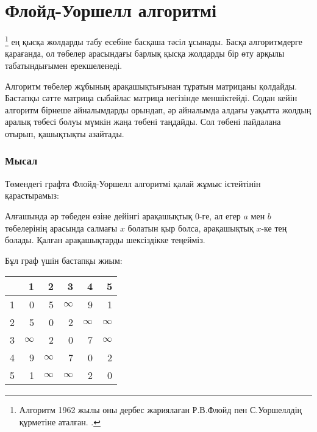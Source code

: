 \section{Флойд-Уоршелл алгоритмі}


\footnote{Алгоритм 1962 жылы оны дербес жариялаған Р.В.Флойд пен С.Уоршеллдің құрметіне аталған. \cite{flo62,war62}.}
ең қысқа жолдарды табу есебіне басқаша тәсіл ұсынады.
Басқа алгоритмдерге қарағанда, ол төбелер арасындағы барлық қысқа жолдарды бір өту арқылы табатындығымен ерекшеленеді.

Алгоритм төбелер жұбының арақашықтығынан тұратын матрицаны қолдайды. Бастапқы сәтте матрица сыбайлас матрица негізінде меншіктейді.   
Содан кейін алгоритм бірнеше айналымдарды орындап, әр айналымда алдағы уақытта жолдың аралық төбесі болуы мүмкін жаңа төбені таңдайды.  Сол төбені пайдалана отырып, қашықтықты азайтады.

\subsubsection{Мысал}

Төмендегі графта Флойд-Уоршелл алгоритмі  
қалай жұмыс істейтінін қарастырамыз:

\begin{center}
\end{center}

Алғашында әр төбеден өзіне дейінгі арақашықтық $0$-ге,
ал егер $a$ мен $b$ төбелерінің арасында салмағы $x$ 
болатын қыр болса, арақашықтық $x$-ке тең болады.
Қалған арақашықтарды шексіздікке теңейміз.

Бұл граф үшін бастапқы жиым:
\begin{center}
\begin{tabular}{r|rrrrr}
 & 1 & 2 & 3 & 4 & 5 \\
\hline
1 & 0 & 5 & $\infty$ & 9 & 1 \\
2 & 5 & 0 & 2 & $\infty$ & $\infty$ \\
3 & $\infty$ & 2 & 0 & 7 & $\infty$ \\
4 & 9 & $\infty$ & 7 & 0 & 2 \\
5 & 1 & $\infty$ & $\infty$ & 2 & 0 \\
\end{tabular}
\end{center}
\vspace{10pt}


